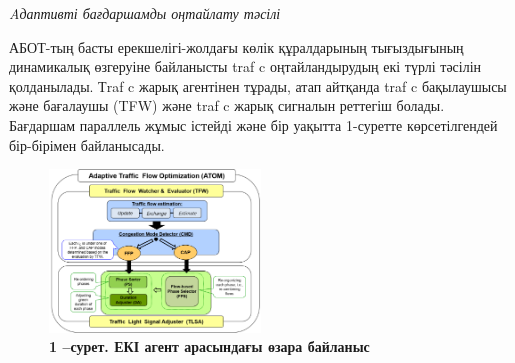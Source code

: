 \begin{multicols}{2}
\emph{Aдаптивті бағдаршамды оңтайлату тәсілі}

АБОТ-тың басты ерекшелігі-жолдағы көлік құралдарының тығыздығының
динамикалық өзгеруіне байланысты traf c оңтайландырудың екі түрлі
тәсілін қолданылады. Тraf c жарық агентінен тұрады, атап айтқанда traf c
бақылаушысы және бағалаушы (TFW) және traf c жарық сигналын реттегіш
болады. Бағдаршам параллель жұмыс істейді және бір уақытта 1-суретте
көрсетілгендей бір-бірімен байланысады.
\end{multicols}

\begin{figure}[H]
	\centering
	\includegraphics[width=0.5\textwidth]{assets/158}
	\caption*{\bfseries 1 --сурет. ЕКІ агент арасындағы өзара байланыс}
\end{figure}

